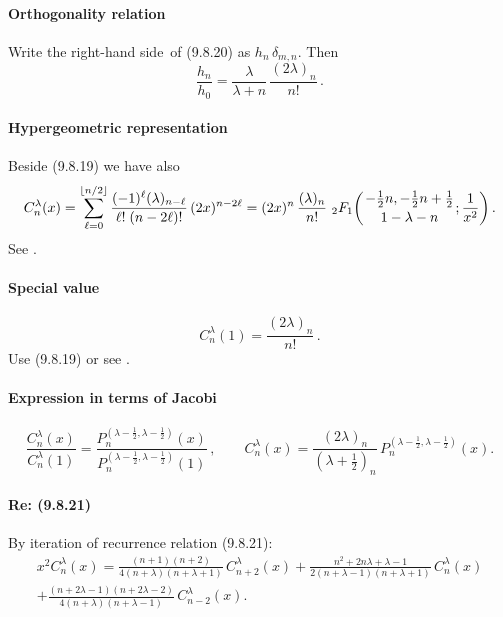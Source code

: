 \documentclass[twoside,11pt]{article}
\newcommand\de\delta
\newcommand\la\lambda
\newcommand\half{\frac12}
\newcommand\thalf{\tfrac12}
\newcommand{\hyp}[5]{\,\mbox{}_{#1}F_{#2}\!\left(
  \genfrac{}{}{0pt}{}{#3}{#4};#5\right)}
\newcommand\RHS{right-hand side}
\begin{document}
\paragraph{Orthogonality relation}
Write the \RHS\ of (9.8.20) as $h_n\,\de_{m,n}$. Then
\begin{equation}
\frac{h_n}{h_0}=
\frac\la{\la+n}\,\frac{(2\la)_n}{n!}\,.
\label{61}
\end{equation}
%
\paragraph{Hypergeometric representation}
Beside (9.8.19) we have also
\begin{equation}
C_n^\lambda(x)=\sum_{\ell=0}^{\lfloor n/2\rfloor}\frac{(-1)^{\ell}(\lambda)_{n-\ell}}
{\ell!\;(n-2\ell)!}\,(2x)^{n-2\ell}
=(2x)^{n}\,\frac{(\lambda)_{n}}{n!}\,
\hyp21{-\thalf n,-\thalf n+\thalf}{1-\la-n}{\frac1{x^2}}.
\label{57}
\end{equation}
See \cite[(18.5.10)]{DLMF}.
%
\paragraph{Special value}
\begin{equation}
C_n^{\la}(1)=\frac{(2\la)_n}{n!}\,.
\label{49}
\end{equation}
Use (9.8.19) or see \cite[Table 18.6.1]{DLMF}.
%
\paragraph{Expression in terms of Jacobi}
%
\begin{equation}
\frac{C_n^\la(x)}{C_n^\la(1)}=
\frac{P_n^{(\la-\half,\la-\half)}(x)}{P_n^{(\la-\half,\la-\half)}(1)}\,,\qquad
C_n^\la(x)=\frac{(2\la)_n}{(\la+\thalf)_n}\,P_n^{(\la-\half,\la-\half)}(x).
\label{65}
\end{equation}
%
\paragraph{Re: (9.8.21)}
By iteration of recurrence relation (9.8.21):
\begin{multline}
x^2 C_n^\la(x)=
\frac{(n+1)(n+2)}{4(n+\la)(n+\la+1)}\,C_{n+2}^\la(x)+
\frac{n^2+2n\la+\la-1}{2(n+\la-1)(n+\la+1)}\,C_n^\la(x)\\
+\frac{(n+2\la-1)(n+2\la-2)}{4(n+\la)(n+\la-1)}\,C_{n-2}^\la(x).
\label{6}
\end{multline}
%
\end{document}
